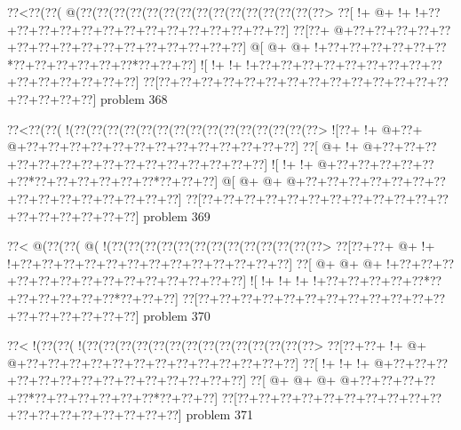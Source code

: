 \vbox{\vbox{\goo
\0??<\0??(\0??(\- @(\0??(\0??(\0??(\0??(\0??(\0??(\0??(\0??(\0??(\0??(\0??(\0??(\0??(\0??(\0??>
\0??[\- !+\- @+\- !+\- !+\0??+\0??+\0??+\0??+\0??+\0??+\0??+\0??+\0??+\0??+\0??+\0??+\0??+\0??]
\0??[\0??+\- @+\0??+\0??+\0??+\0??+\0??+\0??+\0??+\0??+\0??+\0??+\0??+\0??+\0??+\0??+\0??+\0??]
\- @[\- @+\- @+\- !+\0??+\0??+\0??+\0??+\0??+\0??*\0??+\0??+\0??+\0??+\0??+\0??*\0??+\0??+\0??]
\- ![\- !+\- !+\- !+\0??+\0??+\0??+\0??+\0??+\0??+\0??+\0??+\0??+\0??+\0??+\0??+\0??+\0??+\0??]
\0??[\0??+\0??+\0??+\0??+\0??+\0??+\0??+\0??+\0??+\0??+\0??+\0??+\0??+\0??+\0??+\0??+\0??+\0??]
}
\hfil problem 368\hfil\break
}



\vbox{\vbox{\goo
\0??<\0??(\0??(\- !(\0??(\0??(\0??(\0??(\0??(\0??(\0??(\0??(\0??(\0??(\0??(\0??(\0??(\0??(\0??>
\- ![\0??+\- !+\- @+\0??+\- @+\0??+\0??+\0??+\0??+\0??+\0??+\0??+\0??+\0??+\0??+\0??+\0??+\0??]
\0??[\- @+\- !+\- @+\0??+\0??+\0??+\0??+\0??+\0??+\0??+\0??+\0??+\0??+\0??+\0??+\0??+\0??+\0??]
\- ![\- !+\- !+\- @+\0??+\0??+\0??+\0??+\0??+\0??*\0??+\0??+\0??+\0??+\0??+\0??*\0??+\0??+\0??]
\- @[\- @+\- @+\- @+\0??+\0??+\0??+\0??+\0??+\0??+\0??+\0??+\0??+\0??+\0??+\0??+\0??+\0??+\0??]
\0??[\0??+\0??+\0??+\0??+\0??+\0??+\0??+\0??+\0??+\0??+\0??+\0??+\0??+\0??+\0??+\0??+\0??+\0??]
}
\hfil problem 369\hfil\break
}



\vbox{\vbox{\goo
\0??<\- @(\0??(\0??(\- @(\- !(\0??(\0??(\0??(\0??(\0??(\0??(\0??(\0??(\0??(\0??(\0??(\0??(\0??>
\0??[\0??+\0??+\- @+\- !+\- !+\0??+\0??+\0??+\0??+\0??+\0??+\0??+\0??+\0??+\0??+\0??+\0??+\0??]
\0??[\- @+\- @+\- @+\- !+\0??+\0??+\0??+\0??+\0??+\0??+\0??+\0??+\0??+\0??+\0??+\0??+\0??+\0??]
\- ![\- !+\- !+\- !+\- !+\0??+\0??+\0??+\0??+\0??*\0??+\0??+\0??+\0??+\0??+\0??*\0??+\0??+\0??]
\0??[\0??+\0??+\0??+\0??+\0??+\0??+\0??+\0??+\0??+\0??+\0??+\0??+\0??+\0??+\0??+\0??+\0??+\0??]
}
\hfil problem 370\hfil\break
}



\vbox{\vbox{\goo
\0??<\- !(\0??(\0??(\- !(\0??(\0??(\0??(\0??(\0??(\0??(\0??(\0??(\0??(\0??(\0??(\0??(\0??(\0??>
\0??[\0??+\0??+\- !+\- @+\- @+\0??+\0??+\0??+\0??+\0??+\0??+\0??+\0??+\0??+\0??+\0??+\0??+\0??]
\0??[\- !+\- !+\- !+\- @+\0??+\0??+\0??+\0??+\0??+\0??+\0??+\0??+\0??+\0??+\0??+\0??+\0??+\0??]
\0??[\- @+\- @+\- @+\- @+\0??+\0??+\0??+\0??+\0??*\0??+\0??+\0??+\0??+\0??+\0??*\0??+\0??+\0??]
\0??[\0??+\0??+\0??+\0??+\0??+\0??+\0??+\0??+\0??+\0??+\0??+\0??+\0??+\0??+\0??+\0??+\0??+\0??]
}
\hfil problem 371\hfil\break
}



